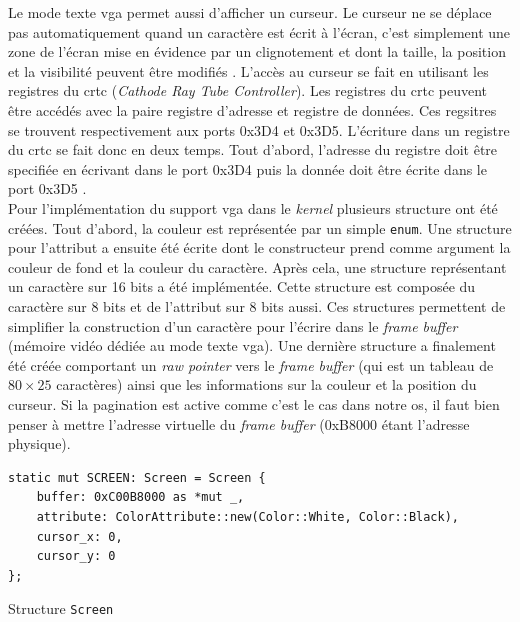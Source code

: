 Le mode texte \acrshort{vga} permet aussi d'afficher un curseur. Le curseur ne
se déplace pas automatiquement quand un caractère est écrit à l'écran, c'est
simplement une zone de l'écran mise en évidence par un clignotement et dont
la taille, la position et la visibilité peuvent être modifiés \cite{ref23}. L'accès
au curseur se fait en utilisant les registres du \acrshort{crtc} (\textit{Cathode Ray
Tube Controller}). Les registres du \acrshort{crtc} peuvent être accédés avec la
paire registre d'adresse et registre de données. Ces regsitres se trouvent respectivement
aux ports 0x3D4 et 0x3D5. L'écriture dans un registre du \acrshort{crtc} se fait
donc en deux temps. Tout d'abord, l'adresse du registre doit être specifiée
en écrivant dans le port 0x3D4 puis la donnée doit être écrite dans le port 0x3D5
\cite{ref42}. \\

Pour l'implémentation du support \acrshort{vga} dans le \textit{kernel} plusieurs
structure ont été créées. Tout d'abord, la couleur est représentée par un simple
\texttt{enum}. Une structure pour l'attribut a ensuite été écrite
dont le constructeur prend comme argument la couleur de fond et la couleur du
caractère. Après cela, une structure représentant un caractère sur 16 bits a été
implémentée. Cette structure est composée du caractère sur 8 bits et de l'attribut
sur 8 bits aussi. Ces structures permettent de simplifier la construction d'un
caractère pour l'écrire dans le \textit{frame buffer} (mémoire vidéo dédiée au
mode texte \acrshort{vga}). Une dernière structure a finalement été créée
comportant un \textit{raw pointer} vers le \textit{frame buffer} (qui est un
tableau de $80 \times 25$ caractères) ainsi que les informations sur la couleur
et la position du curseur. Si la pagination est active comme c'est le cas dans
notre \acrshort{os}, il faut bien penser à mettre l'adresse virtuelle du
\textit{frame buffer} (0xB8000 étant l'adresse physique).

\begin{code}
\begin{verbatim}
static mut SCREEN: Screen = Screen {
    buffer: 0xC00B8000 as *mut _,
    attribute: ColorAttribute::new(Color::White, Color::Black),
    cursor_x: 0,
    cursor_y: 0
};
\end{verbatim}
\caption{Structure \texttt{Screen}}
\label{lst:vga:struct}
\end{code} \bigbreak


